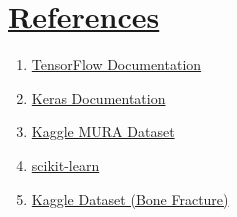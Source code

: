 \documentclass[11pt]{article}
\providecommand{\tightlist}{%
      \setlength{\itemsep}{0pt}\setlength{\parskip}{0pt}}
\begin{document}
   \section*{\Large\underline{\textbf{References}}}\label{references}


\begin{enumerate}
\def\labelenumi{\arabic{enumi}.}
\tightlist
\item
  \href{https://www.tensorflow.org/}{TensorFlow Documentation}
\item
  \href{https://keras.io/}{Keras Documentation}
\item
  \href{https://www.kaggle.com/datasets}{Kaggle MURA Dataset}
\item
  \href{https://scikit-learn.org/}{scikit-learn}
\item
  \href{https://www.kaggle.com/datasets/ahmedashrafahmed/bone-fracture/data}{Kaggle
  Dataset (Bone Fracture)}
\end{enumerate}


    
    
    
\end{document}
